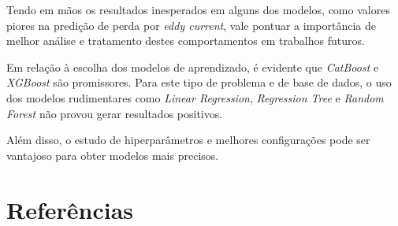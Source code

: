 \documentclass{article}
\begin{document}
Tendo em mãos os resultados inesperados em alguns dos modelos, como valores piores na predição de perda por \textit{eddy current}, vale pontuar a importância de melhor análise e tratamento destes comportamentos em trabalhos futuros.

Em relação à escolha dos modelos de aprendizado, é evidente que \textit{CatBoost} e \textit{XGBoost} são promissores. Para este tipo de problema e de base de dados, o uso dos modelos rudimentares como \textit{Linear Regression}, \textit{Regression Tree} e \textit{Random Forest} não provou gerar resultados positivos.

Além disso, o estudo de hiperparâmetros e melhores configurações pode ser vantajoso para obter modelos mais precisos.

\newpage
\section{Referências}
\end{document}
